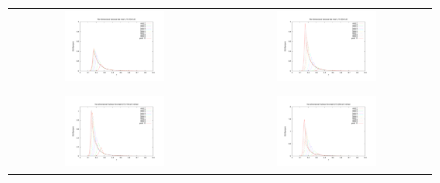 \begin{figure}[h!]
\begin{tabular}{cc}
\includegraphics[width=0.5\textwidth]{variance_ad_free_mesh_t5_v10.pdf} & \includegraphics[width=0.5\textwidth]{variance_ad_free_mesh_t5_v20.pdf}\\\\
\includegraphics[width=0.5\textwidth]{variance_ad_free_mesh_t6_v10.pdf} & \includegraphics[width=0.5\textwidth]{variance_ad_free_mesh_t6_fine_v20.pdf}\\

\end{tabular}
\end{figure}
